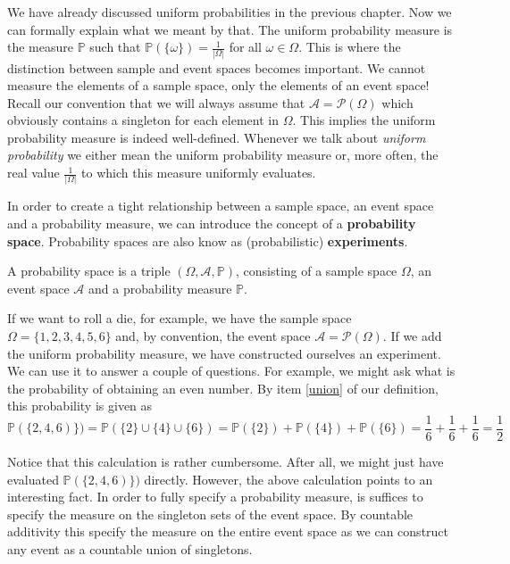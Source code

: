 \documentclass[a4paper,11pt,leqno]{report}
\begin{document}
We have already discussed uniform probabilities in the previous chapter. Now we can formally explain
what we meant by that. The uniform probability measure is the measure $ \mathbb{P} $ such that
$ \mathbb{P}(\{\omega\}) = \frac{1}{|\Omega|} $ for all $ \omega \in \Omega $. This is where the
distinction between sample and event spaces becomes important. We cannot measure the elements of a
sample space, only the elements of an event space! Recall our convention that we will always assume
that $ \mathcal{A} = \mathcal{P}(\Omega) $ which obviously contains a singleton for each element in
$ \Omega $. This implies the uniform probability measure is indeed well-defined. Whenever we talk about
\textit{uniform probability} we either mean the uniform probability measure or, more often, the real
value $ \frac{1}{|\Omega|} $ to which this measure uniformly evaluates.

In order to create a tight relationship between a sample space, an event space and a probability measure,
we can introduce the concept of a \textbf{probability space}. Probability spaces are also know as 
(probabilistic) \textbf{experiments}.

\begin{Definition} \label{ProbabiltySpace}
A probability space is a triple $ (\Omega, \mathcal{A}, \mathbb{P}) $, consisting of a sample space $ \Omega $,
an event space $ \mathcal{A} $ and a probability measure $ \mathbb{P} $.
\end{Definition}

If we want to roll a die, for example, we have the sample space $ \Omega = \{1,2,3,4,5,6\} $ and, by 
convention, the event space $ \mathcal{A} = \mathcal{P}(\Omega) $. If we add the uniform probability measure, 
we have constructed ourselves an experiment. We can use it to answer a couple of questions. For example, we 
might ask what is the probability of obtaining an even number. By item \ref{union} of our definition, this 
probability is given as
\begin{equation}
\mathbb{P}(\{2,4,6)\}) = \mathbb{P}(\{2\} \cup \{4\} \cup \{6\}) = \mathbb{P}(\{2
\}) + \mathbb{P}(\{4\})
+ \mathbb{P}(\{6\}) = \frac{1}{6} + \frac{1}{6} + \frac{1}{6} = \frac{1}{2}
\end{equation}

Notice that this calculation is rather cumbersome. After all, we might just have evaluated 
$ \mathbb{P}(\{2,4,6)\}) $ directly. However, the above calculation points to an interesting fact. In order
to fully specify a probability measure, is suffices to specify the measure on the singleton sets of the
event space. By countable additivity this specify the measure on the entire event space as we can
construct any event as a countable union of singletons.
\end{document}
